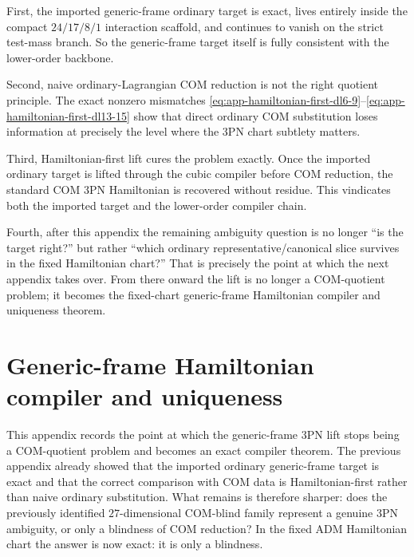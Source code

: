 \documentclass[11pt]{article}
\begin{document}
First, the imported generic-frame ordinary target is exact, lives entirely
inside the compact $24/17/8/1$ interaction scaffold, and continues to vanish on
 the strict test-mass branch.  So the generic-frame target itself is fully
consistent with the lower-order backbone.

Second, naive ordinary-Lagrangian COM reduction is not the right quotient
principle.  The exact nonzero mismatches
\eqref{eq:app-hamiltonian-first-dl6-9}--\eqref{eq:app-hamiltonian-first-dl13-15}
show that direct ordinary COM substitution loses information at precisely the
level where the $3$PN chart subtlety matters.

Third, Hamiltonian-first lift cures the problem exactly.  Once the imported
ordinary target is lifted through the cubic compiler before COM reduction, the
standard COM $3$PN Hamiltonian is recovered without residue.  This vindicates
both the imported target and the lower-order compiler chain.

Fourth, after this appendix the remaining ambiguity question is no longer
``is the target right?'' but rather ``which ordinary representative/canonical
slice survives in the fixed Hamiltonian chart?''  That is precisely the point at
which the next appendix takes over.  From there onward the lift is no longer a
COM-quotient problem; it becomes the fixed-chart generic-frame Hamiltonian
compiler and uniqueness theorem.


\section{Generic-frame Hamiltonian compiler and uniqueness}
\label{app:generic-frame-hamiltonian-compiler-uniqueness}

This appendix records the point at which the generic-frame $3$PN lift stops
being a COM-quotient problem and becomes an exact compiler theorem.
The previous appendix already showed that the imported
ordinary generic-frame target is exact and that the correct comparison with COM
data is Hamiltonian-first rather than naive ordinary substitution.  What
remains is therefore sharper: does the previously identified $27$-dimensional
COM-blind family represent a genuine $3$PN ambiguity, or only a blindness of
COM reduction?  In the fixed ADM Hamiltonian chart the answer is now exact: it
is only a blindness.
\end{document}
